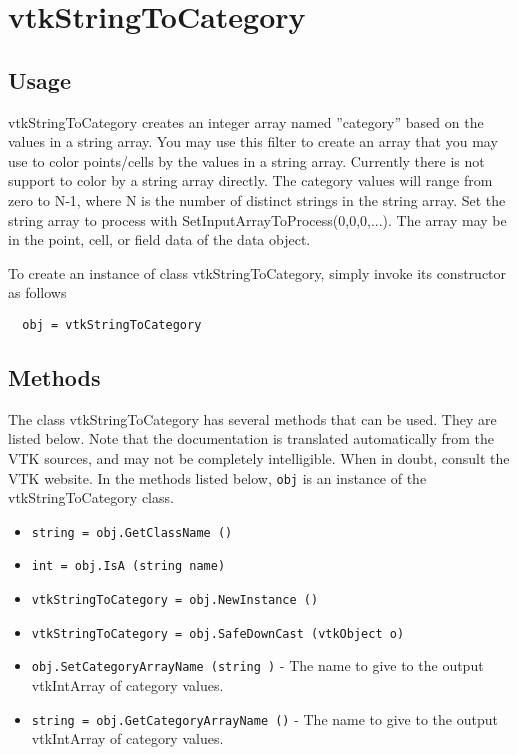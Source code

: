 \section{vtkStringToCategory}

\subsection{Usage}

 vtkStringToCategory creates an integer array named ''category'' based on the
 values in a string array.  You may use this filter to create an array that
 you may use to color points/cells by the values in a string array.  Currently
 there is not support to color by a string array directly.
 The category values will range from zero to N-1,
 where N is the number of distinct strings in the string array.  Set the string
 array to process with SetInputArrayToProcess(0,0,0,...).  The array may be in
 the point, cell, or field data of the data object.

To create an instance of class vtkStringToCategory, simply
invoke its constructor as follows
\begin{verbatim}
  obj = vtkStringToCategory
\end{verbatim}
\subsection{Methods}

The class vtkStringToCategory has several methods that can be used.
  They are listed below.
Note that the documentation is translated automatically from the VTK sources,
and may not be completely intelligible.  When in doubt, consult the VTK website.
In the methods listed below, \verb|obj| is an instance of the vtkStringToCategory class.
\begin{itemize}
\item  \verb|string = obj.GetClassName ()|

\item  \verb|int = obj.IsA (string name)|

\item  \verb|vtkStringToCategory = obj.NewInstance ()|

\item  \verb|vtkStringToCategory = obj.SafeDownCast (vtkObject o)|

\item  \verb|obj.SetCategoryArrayName (string )| -  The name to give to the output vtkIntArray of category values.

\item  \verb|string = obj.GetCategoryArrayName ()| -  The name to give to the output vtkIntArray of category values.

\end{itemize}
